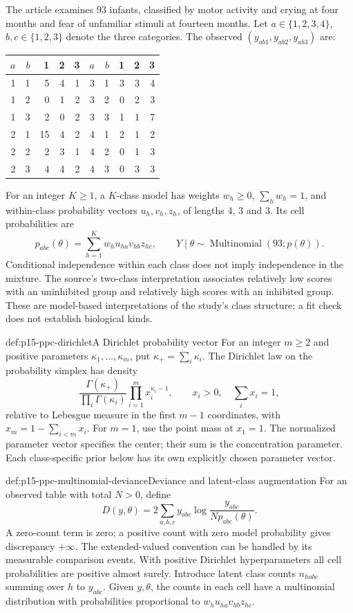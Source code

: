 The article examines 93 infants, classified by motor activity and crying
at four months and fear of unfamiliar stimuli at fourteen months.
Let \(a\in\{1,2,3,4\}\), \(b,c\in\{1,2,3\}\) denote the three
categories. The observed \((y_{ab1},y_{ab2},y_{ab3})\) are:
\begin{center}\small
\begin{tabular}{rr|rrr@{\qquad}rr|rrr}
\hline
\(a\)&\(b\)&1&2&3&\(a\)&\(b\)&1&2&3\\\hline
1&1&5&4&1&3&1&3&3&4\\
1&2&0&1&2&3&2&0&2&3\\
1&3&2&0&2&3&3&1&1&7\\
2&1&15&4&2&4&1&2&1&2\\
2&2&2&3&1&4&2&0&1&3\\
2&3&4&4&2&4&3&0&3&3\\\hline
\end{tabular}
\end{center}
For an integer \(K\geq1\), a \(K\)-class model has weights \(w_h\geq0\), \(\sum_h w_h=1\),
and within-class probability vectors \(u_h,v_h,z_h\), of lengths
4, 3 and 3. Its cell probabilities are
\[
 p_{abc}(\theta)=\sum_{h=1}^K w_hu_{ha}v_{hb}z_{hc},\qquad
 Y\mid\theta\sim\operatorname{Multinomial}(93;p(\theta)).
\]
Conditional independence within each class does not imply independence in
the mixture. The source's two-class interpretation associates relatively
low scores with an uninhibited group and relatively high scores with an
inhibited group. These are model-based interpretations of the study's
class structure; a fit check does not establish biological kinds.

\begin{hbdefinition}{def:p15-ppc-dirichlet}{A Dirichlet probability vector}
For an integer \(m\geq2\) and positive parameters
\(\kappa_1,\ldots,\kappa_m\), put \(\kappa_+=\sum_i\kappa_i\).
The Dirichlet law on the probability simplex has density
\[
 \frac{\Gamma(\kappa_+)}{\prod_i\Gamma(\kappa_i)}
       \prod_{i=1}^m x_i^{\kappa_i-1},\qquad
 x_i>0,\quad \sum_i x_i=1,
\]
relative to Lebesgue measure in the first \(m-1\) coordinates,
with \(x_m=1-\sum_{i<m}x_i\). For \(m=1\), use the point mass
at \(x_1=1\). The normalized parameter vector specifies the center;
their sum is the concentration parameter. Each class-specific prior below
has its own explicitly chosen parameter vector.
\end{hbdefinition}

\begin{hbdefinition}{def:p15-ppc-multinomial-deviance}{Deviance and latent-class augmentation}
For an observed table with total \(N>0\), define
\[
 D(y,\theta)=2\sum_{a,b,c} y_{abc}
              \log\frac{y_{abc}}{Np_{abc}(\theta)}.
\]
A zero-count term is zero; a positive count with zero model probability
gives discrepancy \(+\infty\). The extended-valued convention can be
handled by its measurable comparison events. With positive Dirichlet
hyperparameters all cell probabilities are positive almost surely.
Introduce latent class counts \(n_{habc}\) summing over \(h\) to
\(y_{abc}\). Given \(y,\theta\), the counts in each cell have a
multinomial distribution with probabilities proportional to
\(w_hu_{ha}v_{hb}z_{hc}\).
\end{hbdefinition}


